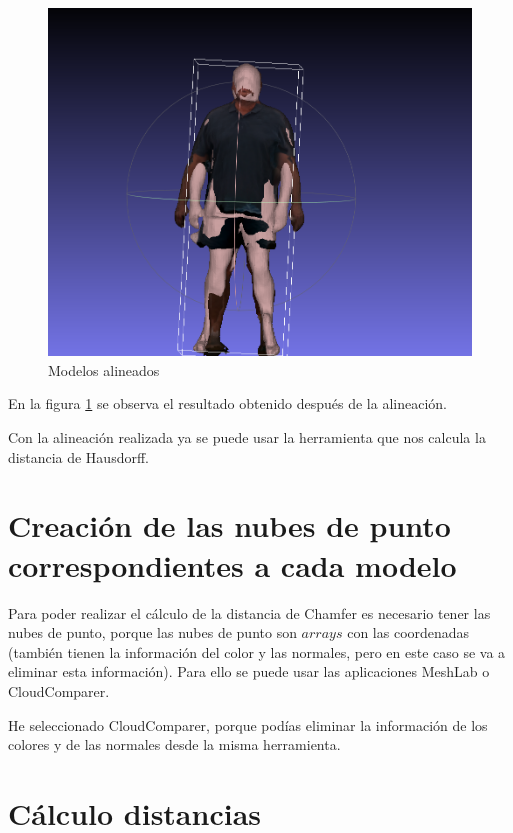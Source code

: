 \begin{figure}[H]
	\centering
	\includegraphics[scale=0.3]{imagenes/alineamiento2.png}
	\caption{Modelos alineados}
	\label{fig:figura11}
\end{figure}

En la figura \ref{fig:figura11} se observa el resultado obtenido después de la alineación.

Con la alineación realizada ya se puede usar la herramienta que nos calcula la distancia de Hausdorff.

\section{Creación de las nubes de punto correspondientes a cada modelo}

Para poder realizar el cálculo de la distancia de Chamfer es necesario tener las nubes de punto, porque las nubes de punto son $arrays$ con las coordenadas (también tienen la información del color y las normales, pero en este caso se va a eliminar esta información). Para ello se puede usar las aplicaciones MeshLab o CloudComparer.

He seleccionado CloudComparer, porque podías eliminar la información de los colores y de las normales desde la misma herramienta.

\section{Cálculo distancias}

